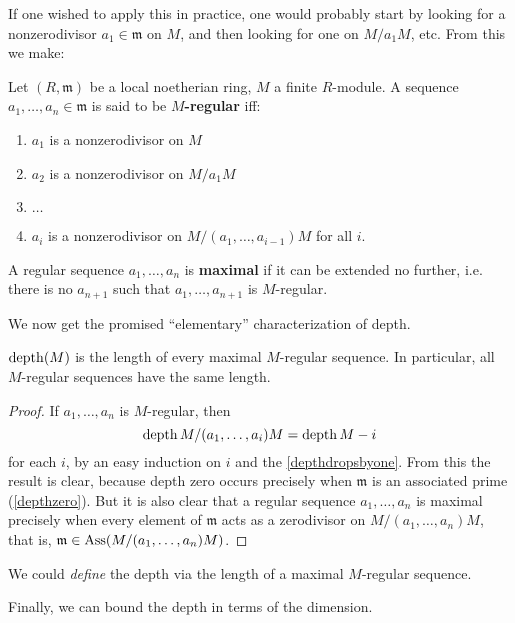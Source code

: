 If one wished to apply this in practice, one would probably start by
looking for a
nonzerodivisor $a_1 \in \mathfrak{m}$ on $M$, and then looking for
one on $M/a_1
M$, etc.
From this we make:

\begin{definition}
Let $(R, \mathfrak{m})$ be a local noetherian ring, $M$ a finite
$R$-module. A
sequence $a_1, \dots, a_n \in \mathfrak{m}$ is said to be
\textbf{$M$-regular} iff:
\begin{enumerate}
\item $a_1$ is a nonzerodivisor on $M$
\item $a_2$ is a nonzerodivisor on $M/a_1 M$
\item  $\dots$
\item $a_i$ is a nonzerodivisor on $M/(a_1, \dots, a_{i-1})M$
for all $i$.
\end{enumerate}
A regular sequence $a_1, \dots, a_n$ is \textbf{maximal } if it
can be extended
no further, i.e. there is no $a_{n+1}$ such that $a_1, \dots,
a_{n+1}$ is
$M$-regular.
\end{definition}

We now get the promised ``elementary'' characterization of depth. 
\begin{corollary} \label{depthregular}
$\operatorname{depth}(M)$ is the length of every maximal $M$-regular
sequence. In particular,
all $M$-regular sequences have the same length.
\end{corollary}

\begin{proof}
If $a_1, \dots, a_n$ is $M$-regular, then
\[ \operatorname{depth} M/(a_1, \dots, a_i)M = \operatorname{depth} M -i  \]
for each $i$, by an easy induction on $i$ and the \cref{depthdropsbyone}.
From this the result is clear, because depth zero occurs precisely when
$\mathfrak{m}$ is an associated prime (\cref{depthzero}). But it is also clear 
that a regular sequence $a_1, \dots, a_n$ is maximal precisely when every
element of $\mathfrak{m}$ acts as a zerodivisor on $M/(a_1, \dots, a_n) M$,
that is, $\mathfrak{m} \in \operatorname{Ass}(M/(a_1, \dots, a_n)M)$.
\end{proof}

\begin{remark}
We could \emph{define} the depth via the length of a maximal
$M$-regular sequence.
\end{remark}

Finally, we can bound the depth in terms of the dimension. 

